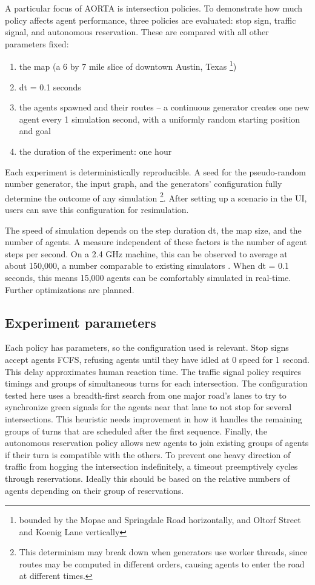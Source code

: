 \documentclass[letterpaper, 10 pt, conference]{ieeeconf}  %
\begin{document}
A particular focus of AORTA is intersection policies. To demonstrate how much
policy affects agent performance, three policies are evaluated: stop sign,
traffic signal, and autonomous reservation. These are compared with all other
parameters fixed:

\begin{enumerate}
  \item the map (a 6 by 7 mile slice of downtown Austin, Texas
        \footnote{bounded by the Mopac and Springdale Road horizontally,
        and Oltorf Street and Koenig Lane vertically})
  \item dt = 0.1 seconds
  \item the agents spawned and their routes -- a continuous generator creates
        one new agent every 1 simulation second, with a uniformly random
        starting position and goal
  \item the duration of the experiment: one hour
\end{enumerate}

Each experiment is deterministically reproducible. A seed for the pseudo-random
number generator, the input graph, and the generators' configuration fully
determine the outcome of any simulation \footnote{This determinism may break
  down when generators use worker threads, since routes may be computed in
different orders, causing agents to enter the road at different times.}. After
setting up a scenario in the UI, users can save this configuration for
resimulation.

The speed of simulation depends on the step duration dt, the map size, and the
number of agents. A measure independent of these factors is the number of agent
steps per second. On a 2.4 GHz machine, this can be observed to average at about
150,000, a number comparable to existing simulators \cite{SUMOthesis}. When dt
= 0.1 seconds, this means 15,000 agents can be comfortably simulated in
real-time. Further optimizations are planned.

\subsection{Experiment parameters}

Each policy has parameters, so the configuration used is relevant. Stop signs
accept agents FCFS, refusing agents until they have idled at 0 speed for 1
second. This delay approximates human reaction time. The traffic signal policy
requires timings and groups of simultaneous turns for each intersection. The
configuration tested here uses a breadth-first search from one major road's
lanes to try to synchronize green signals for the agents near that lane to not
stop for several intersections. This heuristic needs improvement in how it
handles the remaining groups of turns that are scheduled after the first
sequence. Finally, the autonomous reservation policy allows new agents to join
existing groups of agents if their turn is compatible with the others. To
prevent one heavy direction of traffic from hogging the intersection
indefinitely, a timeout preemptively cycles through reservations. Ideally this
should be based on the relative numbers of agents depending on their
group of reservations.
\end{document}
